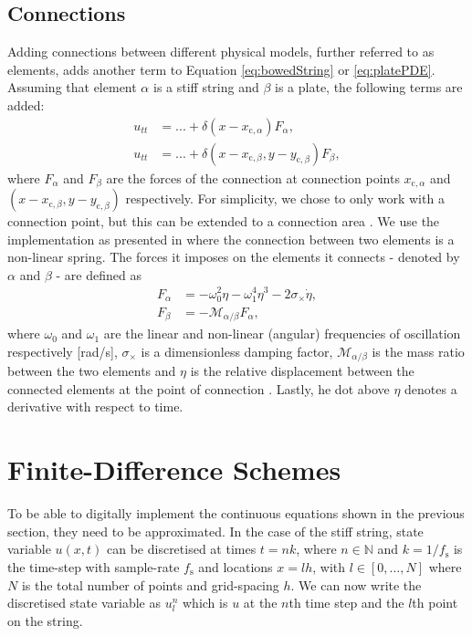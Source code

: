 \documentclass{article}
\begin{document}
\subsection{Connections}\label{sec:connections}
Adding connections between different physical models, further referred to as elements, adds another term to Equation \eqref{eq:bowedString} or \eqref{eq:platePDE}. Assuming that element $\alpha$ is a stiff string and $\beta$ is a plate, the following terms are added:
\begin{subequations}
\begin{align}
    \label{eq:stringConnection}
    u_{tt} &= ... + \delta(x-x_{\text{c},\alpha})F_\alpha, \\
    \label{eq:plateConnection}
    u_{tt} &= ... + \delta(x-x_{\text{c},\beta}, y-y_{\text{c},\beta})F_\beta,
\end{align}
\end{subequations}
where $F_\alpha$ and $F_\beta$ are the forces of the connection at connection points $x_{\text{c},\alpha}$ and $(x-x_{\text{c},\beta}, y-y_{\text{c},\beta})$ respectively. For simplicity, we chose to only work with a connection point, but this can be extended to a connection area \cite{Bilbao2009:ModularPercussion}. We use the implementation as presented in \cite{Bilbao2009:ModularPercussion} where the connection between two elements is a non-linear spring. The forces it imposes on the elements it connects - denoted by $\alpha$ and $\beta$ - are defined as
\begin{subequations}\label{eq:connectionsPDE}
\begin{align}
    F_\alpha &= -\omega_0^2\eta - \omega_1^4\eta^3 - 2\sigma_\times\dot\eta,\\
    F_\beta &= -\mathcal{M}_{\alpha/\beta}F_\alpha,
\end{align}
\end{subequations}
where $\omega_0$ and $\omega_1$ are the linear and non-linear (angular) frequencies of oscillation respectively [rad/s], $\sigma_\times$ is a dimensionless damping factor, $\mathcal{M}_{\alpha/\beta}$ is the mass ratio between the two elements and $\eta$ is the relative displacement between the connected elements at the point of connection%
. Lastly, he dot above $\eta$ denotes a derivative with respect to time.

\section{Finite-Difference Schemes}\label{sec:FDS}
To be able to digitally implement the continuous equations shown in the previous section, they need to be approximated. In the case of the stiff string, state variable $u(x,t)$ can be discretised at times $t = nk$, where $n \in \mathbb{N}$ and $k = 1 / f_\text{s}$ is the time-step with sample-rate $f_\text{s}$ and locations $x = lh$, with $l \in [0,\hdots, N]$ where $N$ is the total number of points and grid-spacing $h$. We can now write the discretised state variable as $u_l^n$ which is $u$ at the $n$th time step and the $l$th point on the string.
\end{document}
